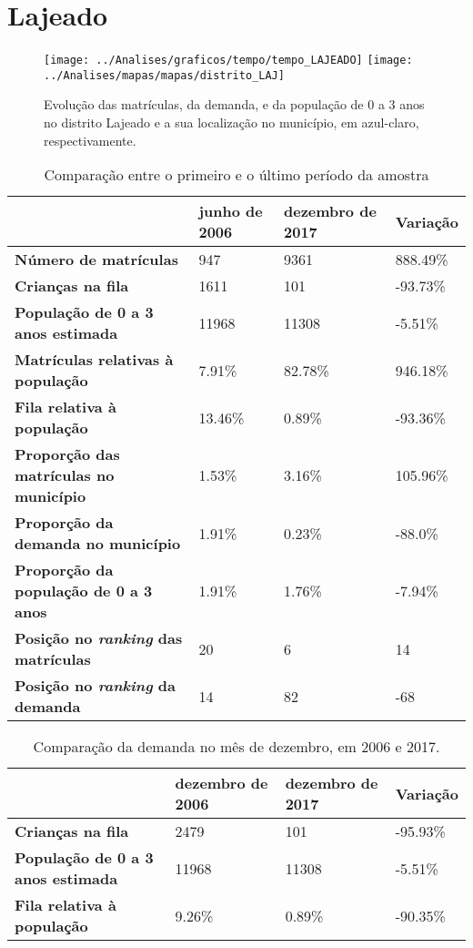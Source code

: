 \section{Lajeado}
\begin{figure}[H]
\centering
\texttt{[image: ../Analises/graficos/tempo/tempo\_LAJEADO]}
\texttt{[image: ../Analises/mapas/mapas/distrito\_LAJ]}
\caption{Evolução das matrículas, da demanda, e da população de 0 a 3 anos no distrito Lajeado e a sua localização no município, em azul-claro, respectivamente.}
\end{figure}
\begin{table}[H]
\begin{tabular}{l|l|l|l}
\textbf{}                                      & \textbf{junho de 2006}       & \textbf{dezembro de 2017}    & \textbf{Variação} \\ \hline
\textbf{Número de matrículas}                  & 947 & 9361 & 888.49\% \\ \hline
\textbf{Crianças na fila}                      & 1611 & 101 & -93.73\% \\ \hline
\textbf{População de 0 a 3 anos estimada}      & 11968 & 11308 & -5.51\% \\ \hline
\textbf{Matrículas relativas à população}      & 7.91\% & 82.78\% & 946.18\% \\ \hline
\textbf{Fila relativa à população}             & 13.46\% & 0.89\% & -93.36\% \\ \hline
\textbf{Proporção das matrículas no município} & 1.53\% & 3.16\% & 105.96\% \\ \hline
\textbf{Proporção da demanda no município}     & 1.91\% & 0.23\% & -88.0\% \\ \hline
\textbf{Proporção da população de 0 a 3 anos}  & 1.91\% & 1.76\% & -7.94\% \\ \hline
\textbf{Posição no \textit{ranking} das matrículas}     & 20 & 6 & 14 \\ \hline
\textbf{Posição no \textit{ranking} da demanda}         & 14 & 82 & -68 \\ 
\end{tabular}
\caption{Comparação entre o primeiro e o último período da amostra}
\end{table}
\begin{table}[H]
\begin{tabular}{l|l|l|l}
\textbf{}                                 & \textbf{dezembro de 2006} & \textbf{dezembro de 2017} & \textbf{Variação} \\ \hline
\textbf{Crianças na fila}                      & 2479 & 101 & -95.93\% \\ \hline
\textbf{População de 0 a 3 anos estimada}      & 11968 & 11308 & -5.51\% \\ \hline
\textbf{Fila relativa à população}             & 9.26\% & 0.89\% & -90.35\% \\
\end{tabular}
\caption{Comparação da demanda no mês de dezembro, em 2006 e 2017.}
\end{table}
